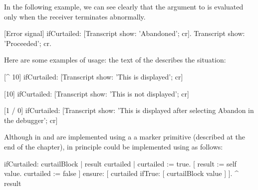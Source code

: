 \documentclass[a4paper,10pt,twoside]{book}
\begin{document}
In the following example, we can see clearly that the argument to  is evaluated only when the receiver terminates abnormally.
\begin{code}{}
[Error signal] ifCurtailed: [Transcript show: 'Abandoned'; cr].
Transcript show: 'Proceeded'; cr.
\end{code}


Here are some  examples of  usage: the text of the  describes the situation:

\begin{code}{}
[^ 10] ifCurtailed: [Transcript show: 'This is displayed'; cr] 

[10] ifCurtailed: [Transcript show: 'This is not displayed'; cr] 

[1 / 0] ifCurtailed: [Transcript show: 'This is displayed after selecting Abandon in the debugger'; cr]
\end{code}

Although in \pharo {} and  are implemented using a a marker primitive (described at the end of the chapter), 
in principle  could be implemented using  as follows:

\begin{code}{}
ifCurtailed: curtailBlock
	| result curtailed |
	curtailed := true.
	[	result := self value.
		curtailed := false ] ensure: [ curtailed ifTrue: [ curtailBlock value ] ].
	^ result
\end{code}
\end{document}
